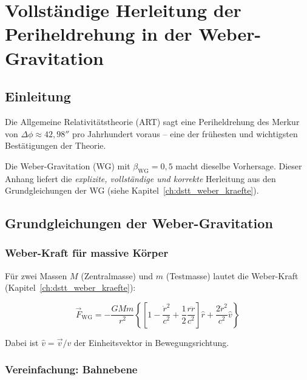 
\chapter{Vollständige Herleitung der Periheldrehung in der Weber-Gravitation}
\label{app:periheldrehung}

\section{Einleitung}
\label{app:periheldrehung_einleitung}

Die Allgemeine Relativitätstheorie (ART) sagt eine Periheldrehung des Merkur 
von \( \Delta \phi \approx 42,98'' \) pro Jahrhundert voraus – eine der 
frühesten und wichtigsten Bestätigungen der Theorie.

Die Weber-Gravitation (WG) mit \( \beta_{\text{WG}} = 0,5 \) macht dieselbe 
Vorhersage. Dieser Anhang liefert die \emph{explizite, vollständige und korrekte} 
Herleitung aus den Grundgleichungen der WG (siehe Kapitel~\ref{ch:dstt_weber_kraefte}).

\section{Grundgleichungen der Weber-Gravitation}
\label{app:periheldrehung_grundlagen}

\subsection{Weber-Kraft für massive Körper}
\label{sub:periheldrehung_weber_kraft}

Für zwei Massen \( M \) (Zentralmasse) und \( m \) (Testmasse) lautet die 
Weber-Kraft (Kapitel~\ref{ch:dstt_weber_kraefte}):

\[
\vec{F}_{\text{WG}} = -\frac{GMm}{r^2} 
\left\{ 
\left[ 1 - \frac{\dot{r}^2}{c^2} + \frac{1}{2} \frac{r\ddot{r}}{c^2} \right] \hat{r} 
+ \frac{2\dot{r}^2}{c^2} \hat{v} 
\right\}
\]

Dabei ist \( \hat{v} = \vec{v}/v \) der Einheitsvektor in Bewegungsrichtung.

\subsection{Vereinfachung: Bahnebene}
\label{sub:periheldrehung_bahnebene}

